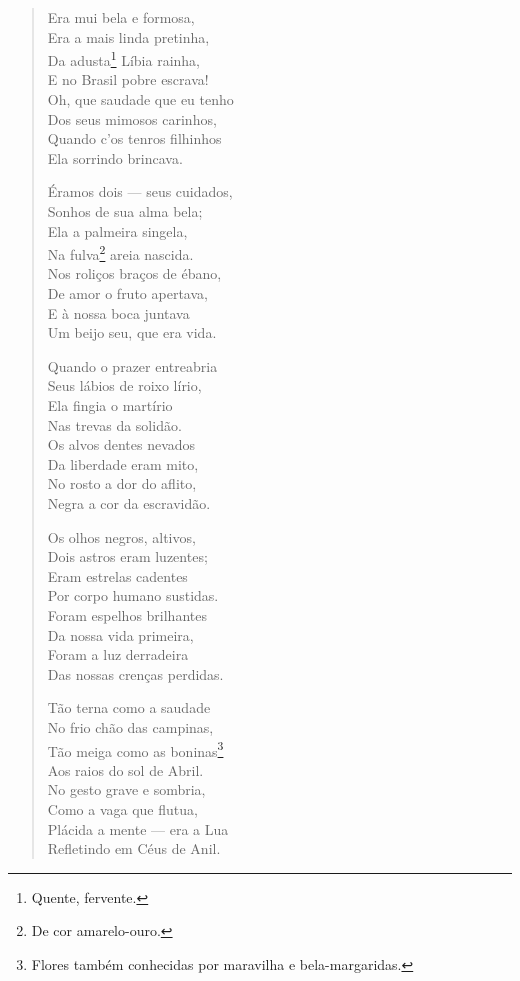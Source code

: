 \begin{verse}
Era mui bela e formosa,\\
Era a mais linda pretinha,\\
Da adusta\footnote{Quente, fervente.} Líbia rainha,\\
E no Brasil pobre escrava!\\
Oh, que saudade que eu tenho\\
Dos seus mimosos carinhos,\\
Quando c'os tenros filhinhos\\
Ela sorrindo brincava.

Éramos dois --- seus cuidados,\\
Sonhos de sua alma bela;\\
Ela a palmeira singela,\\
Na fulva\footnote{De cor amarelo-ouro.} areia nascida.\\
Nos roliços braços de ébano,\\
De amor o fruto apertava,\\
E à nossa boca juntava\\
Um beijo seu, que era vida.

Quando o prazer entreabria\\
Seus lábios de roixo lírio,\\
Ela fingia o martírio\\
Nas trevas da solidão.\\
Os alvos dentes nevados\\
Da liberdade eram mito,\\
No rosto a dor do aflito,\\
Negra a cor da escravidão.

Os olhos negros, altivos,\\
Dois astros eram luzentes;\\
Eram estrelas cadentes\\
Por corpo humano sustidas.\\
Foram espelhos brilhantes\\
Da nossa vida primeira,\\
Foram a luz derradeira\\
Das nossas crenças perdidas.

Tão terna como a saudade\\
No frio chão das campinas,\\
Tão meiga como as boninas\footnote{Flores também conhecidas por maravilha e bela-margaridas.}\\
Aos raios do sol de Abril.\\
No gesto grave e sombria,\\
Como a vaga que flutua,\\
Plácida a mente --- era a Lua\\
Refletindo em Céus de Anil.


\end{verse}
